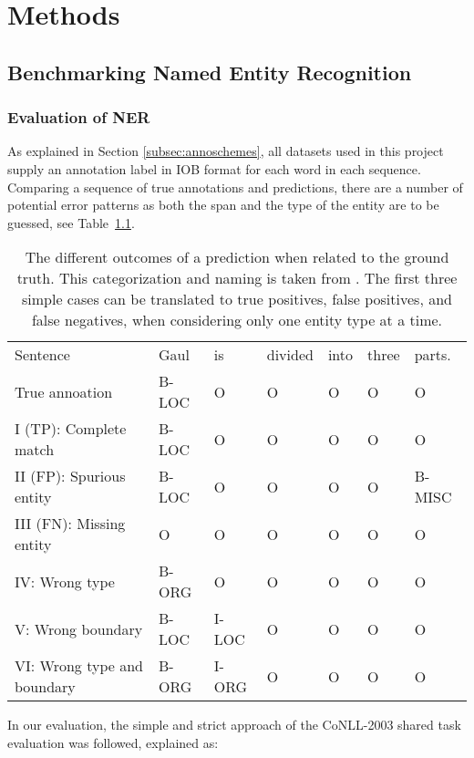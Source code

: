 \documentclass[main.tex]{subfiles}
\begin{document}
\chapter{Methods}
\label{chap:methods}

\section{Benchmarking Named Entity Recognition}
\subsection{Evaluation of NER}
\label{subsec:nereval}
As explained in Section \ref{subsec:annoschemes}, all datasets used in this project supply an annotation label in IOB format \cite{ramshaw1995IOB} for each word in each sequence.
Comparing a sequence of true annotations and predictions, there are a number of potential error patterns as both the span and the type of the entity are to be guessed, see Table~\ref{tab:eval}.
\begin{table}[H]
    \footnotesize
    \centering
    \begin{tabular}{l|llllll}
        Sentence                    & Gaul & is & divided & into & three & parts.\\
        True annoation              & B-LOC & O & O & O & O & O \\\hline
        I (TP): Complete match      & B-LOC & O & O & O & O & O \\
        II (FP): Spurious entity    & B-LOC & O & O & O & O & B-MISC \\
        III (FN): Missing entity    & O     & O & O & O & O & O \\
        IV: Wrong type              & B-ORG & O & O & O & O & O \\
        V: Wrong boundary           & B-LOC & I-LOC & O & O & O & O \\
        VI: Wrong type and boundary & B-ORG & I-ORG & O & O & O & O
    \end{tabular}
    \caption{
        The different outcomes of a prediction when related to the ground truth.
        This categorization and naming is taken from \cite{batista2018eval}.
        The first three simple cases can be translated to true positives, false positives, and false negatives, when considering only one entity type at a time.
    }
    \label{tab:eval}
\end{table}\noindent
In our evaluation, the simple and strict approach of the CoNLL-2003 shared task evaluation was followed, explained as:
\end{document}

